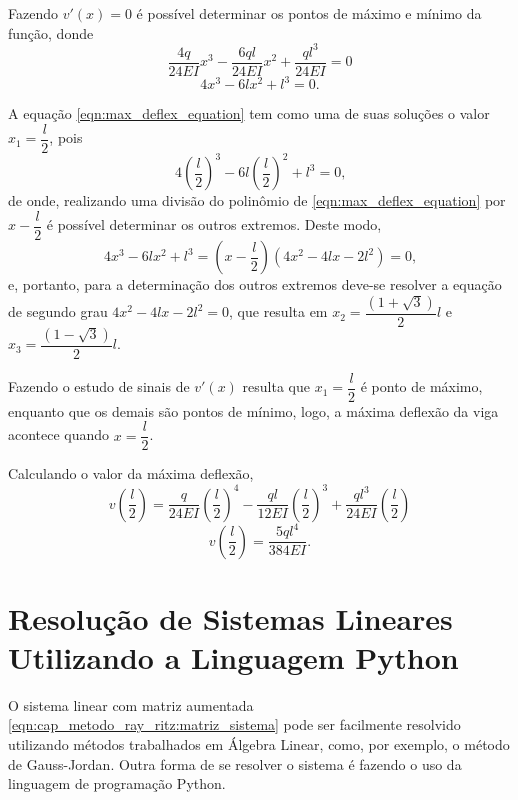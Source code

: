 \documentclass[
	12pt,				%
	openright,			%
    twoside,			%
	a4paper,			%
	english,			%
	french,				%
	spanish,			%
	brazil				%
	]{abntex2}
\numberwithin{lema}{chapter}
\numberwithin{teorema}{chapter}
\numberwithin{definicao}{chapter}
\numberwithin{exemplo}{chapter}
\numberwithin{figure}{chapter}
\begin{document}
\begin{apendicesenv}
{	Fazendo $v'(x)=0$ é possível determinar os pontos de máximo e mínimo da função, donde
	$$
		\frac{4q}{24EI}x^3
		-
		\frac{6ql}{24EI}x^2
		+
		\frac{ql^3}{24EI}
		= 0
	$$
	\begin{equation}
		\label{eqn:max_deflex_equation}
		4x^3 - 6lx^2 + l^3 = 0
		\text{.}
	\end{equation}
	
	A equação \eqref{eqn:max_deflex_equation} tem como uma de suas soluções o valor $x_1=\dfrac{l}{2}$, pois
	$$
		4\left (\frac{l}{2}\right )^3 - 6l\left ( \frac{l}{2}\right )^2+l^3=0
		\text{,}
	$$
	de onde, realizando uma divisão do polinômio de \eqref{eqn:max_deflex_equation} por $x-\dfrac{l}{2}$ é possível determinar os outros extremos. Deste modo,
	$$
		4x^3-6lx^2+l^3 = (x-\frac{l}{2})(4x^2-4lx-2l^2)=0
		\text{,}
	$$
	e, portanto, para a determinação dos outros extremos deve-se resolver a equação de segundo grau $4x^2-4lx-2l^2=0$, que resulta em $x_2=\dfrac{(1+\sqrt{3})}{2}l$ e $x_3=\dfrac{(1-\sqrt{3})}{2}l$.
	
	Fazendo o estudo de sinais de $v'(x)$ resulta que $x_1=\dfrac{l}{2}$ é ponto de máximo, enquanto que os demais são pontos de mínimo, logo, a máxima deflexão da viga acontece quando $x=\dfrac{l}{2}$.
	
	Calculando o valor da máxima deflexão,
	$$
		v\left (\frac{l}{2}\right )=
			\frac{q}{24EI} \left (
				\frac{l}{2}
			\right )^4
			-
			\frac{ql}{12EI} \left (
				\frac{l}{2}
			\right )^3
			+
			\frac{ql^3}{24EI}\left (
				\frac{l}{2}
			\right )
	$$
	\begin{equation}
	\label{eqn:max_deflex_resultado}
		v\left (\frac{l}{2}\right )=
			\frac{5ql^4}{384EI}
			\text{.}
	\end{equation}
}

\chapter{Resolução de Sistemas Lineares Utilizando a Linguagem Python}
\label{apend:res_sis_lin}
{
	O sistema linear com matriz aumentada \eqref{eqn:cap_metodo_ray_ritz:matriz_sistema} pode ser facilmente resolvido utilizando métodos trabalhados em Álgebra Linear, como, por exemplo, o método de Gauss-Jordan. Outra forma de se resolver o sistema é fazendo o uso da linguagem de programação Python.
	
}
\end{apendicesenv}
\end{document}
